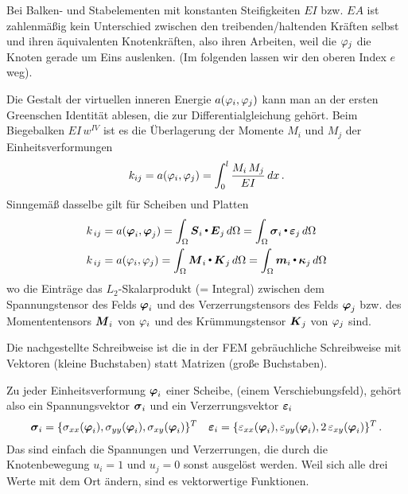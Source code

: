 Bei Balken- und Stabelementen mit konstanten Steifigkeiten $EI$ bzw. $EA$ ist zahlenm\"{a}{\ss}ig kein Unterschied zwischen den treibenden/haltenden Kr\"{a}ften selbst und ihren \"{a}quivalenten Knotenkr\"{a}ften, also ihren Arbeiten, weil die $\varphi_j$ die Knoten gerade um Eins auslenken. (Im folgenden lassen wir den oberen Index $e$ weg).

Die Gestalt der virtuellen inneren Energie $a(\varphi_i,\varphi_j)$ kann man an der ersten Greenschen Identit\"{a}t ablesen, die zur Differentialgleichung geh\"{o}rt. Beim Biegebalken $EI\,w^{IV} $ ist es die \"{U}berlagerung der Momente $M_i$ und $M_j$ der Einheitsverformungen
\begin{align}
k_{ij} = a(\varphi_i,\varphi_j) = \int_{0}^{l}\frac{M_i\, M_j}{EI}\,dx\,.
\end{align}
Sinngem\"{a}{\ss} dasselbe gilt f\"{u}r Scheiben und Platten
\begin{align}
k_{\,ij} &= a(\mbox{\boldmath $\varphi$}_i,\mbox{\boldmath $\varphi$}_j) = \int_{\Omega} \mbox{\boldmath $S$}_i {\,\scriptscriptstyle \stackrel{\bullet}{{}}}\, \mbox{\boldmath $E$}_j\,
d\Omega
= \int_{\Omega} \mbox{\boldmath $\sigma$}_i {\,\scriptscriptstyle \stackrel{\bullet}{{}}}\, \mbox{\boldmath $\varepsilon$}_j \,d\Omega\\
k_{\,ij} &= a(\varphi_i,\varphi_j) = \int_{\Omega} \mbox{\boldmath $M$}_i {\,\scriptscriptstyle \stackrel{\bullet}{{}}}\, \mbox{\boldmath $K$}_j\, d\Omega =
\int_{\Omega} \mbox{\boldmath $m$}_i {\,\scriptscriptstyle \stackrel{\bullet}{{}}}\, \mbox{\boldmath $\kappa$}_j \,d\Omega
\end{align}
wo die Eintr\"{a}ge das $L_2$-Skalarprodukt (= Integral) zwischen dem Spannungstensor des Felds $\mbox{\boldmath $\varphi$}_i$ und des Verzerrungstensors des Felds $\mbox{\boldmath $\varphi$}_j$ bzw. des Momententensors $\mbox{\boldmath $M$}_i$ von $\varphi_i$  und des Kr\"{u}mmungstensor $\mbox{\boldmath $K$}_j$ von $\varphi_j$ sind.

Die nachgestellte Schreibweise ist die in der FEM gebr\"{a}uchliche Schreibweise mit Vektoren (kleine Buchstaben) statt Matrizen (gro{\ss}e Buchstaben).

Zu jeder Einheitsverformung $\mbox{\boldmath $\varphi$}_i $ einer Scheibe, (einem Verschiebungsfeld), geh\"{o}rt also ein Spannungsvektor $\mbox{\boldmath $\sigma$}_i$ und ein  Verzerrungsvektor $\mbox{\boldmath $\varepsilon$}_i$
\begin{align}
\mbox{\boldmath $\sigma$}_i = \{\sigma_{xx}(\mbox{\boldmath $\varphi$}_i), \sigma_{yy}(\mbox{\boldmath $\varphi$}_i), \sigma_{xy}(\mbox{\boldmath $\varphi$}_i)\}^T \quad \mbox{\boldmath $\varepsilon$}_i = \{\varepsilon_{xx}(\mbox{\boldmath $\varphi$}_i), \varepsilon_{yy}(\mbox{\boldmath $\varphi$}_i), 2\,\varepsilon_{xy}(\mbox{\boldmath $\varphi$}_i)\}^T\,.
\end{align}
Das sind einfach die Spannungen und Verzerrungen, die durch die Knotenbewegung $u_i = 1$ und $u_j = 0$ sonst ausgel\"{o}st werden. Weil sich alle drei Werte mit dem Ort \"{a}ndern, sind es vektorwertige Funktionen.

